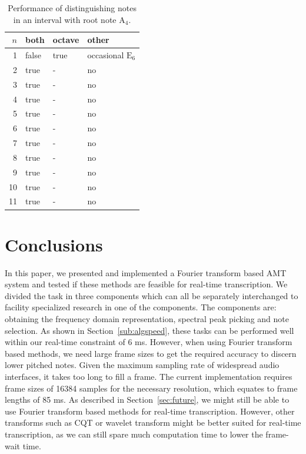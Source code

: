 \documentclass[10pt,twocolumn]{article}
\begin{document}
\vspace{-3mm}
\begin{table}[H]
    \centering
    \begin{tabular}{r|lll}
        $n$ & both & octave & other \\
        \hline
        1  & false & true & occasional $\text{E}_6$ \\
        2  & true & - & no \\
        3  & true & - & no \\
        4  & true & - & no \\
        5  & true & - & no \\
        6  & true & - & no \\
        7  & true & - & no \\
        8  & true & - & no \\
        9  & true & - & no \\
        10 & true & - & no \\
        11 & true & - & no
    \end{tabular}
    \caption{Performance of distinguishing notes in an interval with root note $\text{A}_4$.}
    \label{tab:polperf3}
\end{table}%


\section{Conclusions}
In this paper, we presented and implemented a Fourier transform based AMT system and tested if these methods are feasible for real-time transcription. We divided the task in three components which can all be separately interchanged to facility specialized research in one of the components. The components are: obtaining the frequency domain representation, spectral peak picking and note selection. As shown in Section~\ref{sub:algspeed}, these tasks can be performed well within our real-time constraint of 6 ms. However, when using Fourier transform based methods, we need large frame sizes to get the required accuracy to discern lower pitched notes. Given the maximum sampling rate of widespread audio interfaces, it takes too long to fill a frame. The current implementation requires frame sizes of 16384 samples for the necessary resolution, which equates to frame lengths of 85 ms. As described in Section~\ref{sec:future}, we might still be able to use Fourier transform based methods for real-time transcription. However, other transforms such as CQT or wavelet transform might be better suited for real-time transcription, as we can still spare much computation time to lower the frame-wait time.
\end{document}
